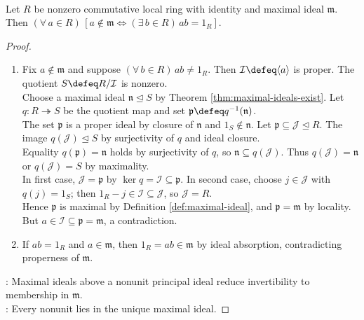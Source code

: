 \begin{proposition} \label{prop:units-in-local-ring} \\
Let $R$ be nonzero commutative local ring with identity and maximal ideal $\mathfrak{m}$. Then $(\forall\,a\in R)\,[a\notin\mathfrak{m}\Longleftrightarrow(\exists\,b\in R)\,ab=1_R]$.
\begin{proof}
\begin{enumerate}[label=\roman*.]
\setlength{\itemsep}{0pt}
\item[$(\Rightarrow)$] Fix $a\notin\mathfrak{m}$ and suppose $(\forall\,b\in R)\,ab\neq1_R$. Then $\mathcal{I}\defeq\langle a\rangle$ is proper. The quotient $S\defeq R/\mathcal{I}$ is nonzero.\\
Choose a maximal ideal $\mathfrak{n}\trianglelefteq S$ by Theorem \ref{thm:maximal-ideals-exist}. Let $q:R\twoheadrightarrow S$ be the quotient map and set $\mathfrak{p}\defeq q^{-1}(\mathfrak{n})$.\\
The set $\mathfrak{p}$ is a proper ideal by closure of $\mathfrak{n}$ and $1_S\notin\mathfrak{n}$. Let $\mathfrak{p}\subseteq\mathcal{J}\trianglelefteq R$. The image $q(\mathcal{J})\trianglelefteq S$ by surjectivity of $q$ and ideal closure.\\
Equality $q(\mathfrak{p})=\mathfrak{n}$ holds by surjectivity of $q$, so $\mathfrak{n}\subseteq q(\mathcal{J})$. Thus $q(\mathcal{J})=\mathfrak{n}$ or $q(\mathcal{J})=S$ by maximality.\\
In first case, $\mathcal{J}=\mathfrak{p}$ by $\ker q=\mathcal{I}\subseteq\mathfrak{p}$. In second case, choose $j\in\mathcal{J}$ with $q(j)=1_S$; then $1_R-j\in\mathcal{I}\subseteq\mathcal{J}$, so $\mathcal{J}=R$.\\
Hence $\mathfrak{p}$ is maximal by Definition \ref{def:maximal-ideal}, and $\mathfrak{p}=\mathfrak{m}$ by locality. But $a\in\mathcal{I}\subseteq\mathfrak{p}=\mathfrak{m}$, a contradiction.
\item[$(\Leftarrow)$] If $ab=1_R$ and $a\in\mathfrak{m}$, then $1_R=ab\in\mathfrak{m}$ by ideal absorption, contradicting properness of $\mathfrak{m}$.
\end{enumerate}
: Maximal ideals above a nonunit principal ideal reduce invertibility to membership in $\mathfrak{m}$.\\
: Every nonunit lies in the unique maximal ideal.
\end{proof}
\end{proposition}

